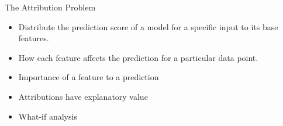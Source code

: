 \begin{frame}{The Attribution Problem\footnotemark}
	\begin{itemize}
		\item Distribute the prediction score of a model for a specific input to its base features.
		\item How each feature affects the prediction for a particular data point.
		\item Importance of a feature to a prediction
		\item Attributions have explanatory value
		\item What-if analysis
	\end{itemize}
\end{frame}